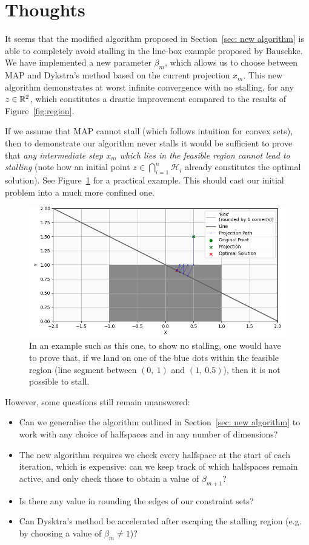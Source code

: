 \documentclass[hidelinks]{article}
\begin{document}
\section{Thoughts}
%
It seems that the modified algorithm proposed in Section~\ref{sec: new algorithm} is able to completely avoid stalling in the line-box example proposed by Bauschke. We have implemented a new parameter $\beta_m$, which allows us to choose between MAP and Dykstra's method based on the current projection $x_m$. This new algorithm demonstrates at worst infinite convergence with no stalling, for any $z \in \mathbb{R}^{2}$, which constitutes a drastic improvement compared to the results of Figure~\ref{fig:region}.
\par If we assume that MAP cannot stall (which follows intuition for convex sets), then to demonstrate our algorithm never stalls it would be sufficient to prove that \emph{any intermediate step $x_m$ which lies in the feasible region cannot lead to stalling} (note how an initial point $z \in \bigcap_{i=1}^n \mathcal{H}_i$ already constitutes the optimal solution). See Figure~\ref{fig:intermediates} for a practical example. This should cast our initial problem into a much more confined one.
%
\begin{figure}[h!]
    \centering
    
    \includegraphics[width=1\textwidth]{Latex/Current Version/Figures/intermediate_steps.png}
    \caption{In an example such as this one, to show no stalling, one would have to prove that, if we land on one of the blue dots within the feasible region (line segment between $(0,~1)$ and $(1,~0.5)$), then it is not possible to stall.}
    \label{fig:intermediates}

\end{figure}
%
\par However, some questions still remain unanswered:
\begin{itemize}
\item Can we generalise the algorithm outlined in Section~\ref{sec: new algorithm} to work with any choice of halfspaces and in any number of dimensions?
\item The new algorithm requires we check every halfspace at the start of each iteration, which is expensive: can we keep track of which halfspaces remain active, and only check those to obtain a value of $\beta_{m+1}$?
\item Is there any value in rounding the edges of our constraint sets?
\item Can Dysktra's method be accelerated after escaping the stalling region (e.g. by choosing a value of $\beta_m \neq 1$)?
\end{itemize}
%
\newpage


\end{document}
